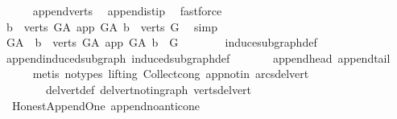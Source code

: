 \begin{isabellebody}
\ \ \ \ \isamarkupfalse%
\ append{\isacharunderscore}{\kern0pt}verts\ \isamarkupfalse%
\ append{\isacharunderscore}{\kern0pt}is{\isacharunderscore}{\kern0pt}tip\ \isamarkupfalse%
\ fastforce\isanewline
\ \ \isamarkupfalse%
\ \isamarkupfalse%
\ {\isachardoublequoteopen}{\isacharbraceleft}{\kern0pt}b\ {\isasymin}\ verts\ G{\isacharunderscore}{\kern0pt}A{\isachardot}{\kern0pt}\ app\ {\isasymrightarrow}\isactrlsup {\isacharplus}{\kern0pt}\isactrlbsub G{\isacharunderscore}{\kern0pt}A\isactrlesub \ b{\isacharbraceright}{\kern0pt}\ {\isacharequal}{\kern0pt}\ verts\ G{\isachardoublequoteclose}\ \isamarkupfalse%
\ simp\ \isanewline
\ \ \isamarkupfalse%
\ \isamarkupfalse%
\ {\isachardoublequoteopen}G{\isacharunderscore}{\kern0pt}A\ {\isasymrestriction}\ {\isacharbraceleft}{\kern0pt}b\ {\isasymin}\ verts\ G{\isacharunderscore}{\kern0pt}A{\isachardot}{\kern0pt}\ app\ {\isasymrightarrow}\isactrlsup {\isacharplus}{\kern0pt}\isactrlbsub G{\isacharunderscore}{\kern0pt}A\isactrlesub \ b{\isacharbraceright}{\kern0pt}\ {\isacharequal}{\kern0pt}\ G\ {\isachardoublequoteclose}\ \isanewline
\ \ \ \ \isamarkupfalse%
\ induce{\isacharunderscore}{\kern0pt}subgraph{\isacharunderscore}{\kern0pt}def\ \isanewline
\ \ \ \ \isamarkupfalse%
\ append{\isacharunderscore}{\kern0pt}induced{\isacharunderscore}{\kern0pt}subgraph\ induced{\isacharunderscore}{\kern0pt}subgraph{\isacharunderscore}{\kern0pt}def\ \isanewline
\ \ \ \ \ \ append{\isacharunderscore}{\kern0pt}head\ append{\isacharunderscore}{\kern0pt}tail\isanewline
\ \ \ \ \isamarkupfalse%
\ {\isacharparenleft}{\kern0pt}metis\ {\isacharparenleft}{\kern0pt}no{\isacharunderscore}{\kern0pt}types{\isacharcomma}{\kern0pt}\ lifting{\isacharparenright}{\kern0pt}\ Collect{\isacharunderscore}{\kern0pt}cong\ app{\isacharunderscore}{\kern0pt}notin\ arcs{\isacharunderscore}{\kern0pt}del{\isacharunderscore}{\kern0pt}vert\isanewline
\ \ \ \ \ \ \ \ del{\isacharunderscore}{\kern0pt}vert{\isacharunderscore}{\kern0pt}def\ del{\isacharunderscore}{\kern0pt}vert{\isacharunderscore}{\kern0pt}not{\isacharunderscore}{\kern0pt}in{\isacharunderscore}{\kern0pt}graph\ verts{\isacharunderscore}{\kern0pt}del{\isacharunderscore}{\kern0pt}vert{\isacharparenright}{\kern0pt}\ \isanewline
{}\isamarkupfalse%
%
\endisatagproof
{\isafoldproof}%
%
\isadelimproof
\isanewline
%
\endisadelimproof
\isanewline
{}\isamarkupfalse%
\ {\isacharparenleft}{\kern0pt}\ Honest{\isacharunderscore}{\kern0pt}Append{\isacharunderscore}{\kern0pt}One{\isacharparenright}{\kern0pt}\ append{\isacharunderscore}{\kern0pt}no{\isacharunderscore}{\kern0pt}anticone{\isacharcolon}{\kern0pt}\isanewline

\end{isabellebody}
